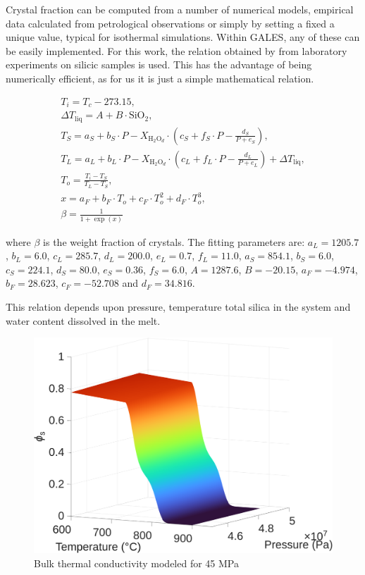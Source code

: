 Crystal fraction can be computed from a number of numerical models, empirical data calculated from petrological observations or simply by setting a fixed a unique value, typical for isothermal simulations. Within GALES, any of these can be easily implemented. For this work, the relation obtained by \cite{abdullin2024} from laboratory experiments on silicic samples is used. This has the advantage of being numerically efficient, as for us it is just a simple mathematical relation.

\begin{equation}
\begin{aligned}
T_i = T_c - 273.15, \\ 
\Delta T_{\text{liq}} = A + B \cdot \text{SiO}_2, \\
T_S = a_S + b_S \cdot P - X_{\text{H}_2\text{O}_d} \cdot \left(c_S + f_S \cdot P - \frac{d_S}{P + e_S} \right),\\
T_L = a_L + b_L \cdot P - X_{\text{H}_2\text{O}_d} \cdot \left(c_L + f_L \cdot P - \frac{d_L}{P + e_L} \right) + \Delta T_{\text{liq}}, \\
T_o = \frac{T_i - T_S}{T_L - T_S}, \\
x = a_F + b_F \cdot T_o + c_F \cdot T_o^2 + d_F \cdot T_o^3, \\
\beta = \frac{1}{1 + \exp(x)}
\end{aligned}
\end{equation}

where $\beta$ is the weight fraction of crystals. The fitting parameters are: 
\( a_L = 1205.7 \), \( b_L = 6.0 \), \( c_L = 285.7 \), \( d_L = 200.0 \), \( e_L = 0.7 \), \( f_L = 11.0 \), \( a_S = 854.1 \), \( b_S = 6.0 \), \( c_S = 224.1 \), \( d_S = 80.0 \), \( e_S = 0.36 \), \( f_S = 6.0 \), \( A = 1287.6 \), \( B = -20.15 \), \( a_F = -4.974 \), \( b_F = 28.623 \), \( c_F = -52.708 \) and \( d_F = 34.816 \).

This relation depends upon pressure, temperature total silica in the system and water content dissolved in the melt.

\begin{figure}
    \centering
    \includegraphics[width=1\linewidth]{img/chapter2/properties/vf_s/vf_s_3D.png}
    \caption{Bulk thermal conductivity modeled for 45 MPa}
    \label{fig:enter-label}
\end{figure}


